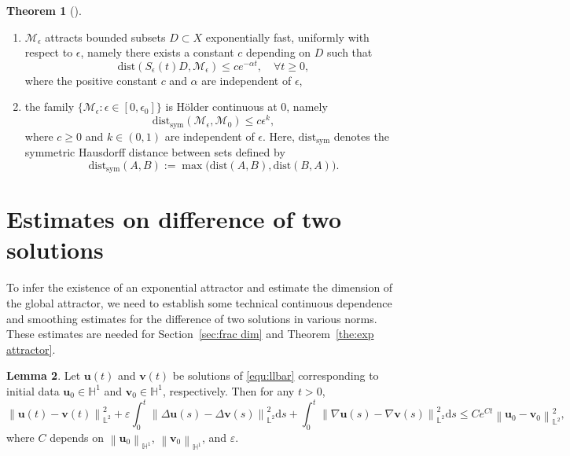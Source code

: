 \documentclass[11pt, reqno]{amsart}
\theoremstyle{definition}
\newtheorem{theorem}{Theorem}[section]
\newtheorem{lemma}[theorem]{Lemma}
\numberwithin{equation}{section}
\newcommand{\bff}{\boldsymbol}
\newcommand{\bb}{\mathbb}
\newcommand{\ds}{\mathrm{d}s}
\newcommand{\norm}[2]{\left\|{#1}\right\|_{#2}}
\begin{document}
\begin{theorem}[\cite{EfeMirZel04, MirZel08}]
\begin{enumerate}
    \item $\mathcal{M}_\epsilon$ attracts bounded subsets $D\subset X$ exponentially fast, uniformly with respect to $\epsilon$, namely there exists a constant $c$ depending on $D$ such that
    \[
        \text{dist}\left(S_\epsilon(t)D, \mathcal{M}_\epsilon\right) \leq c e^{-\alpha t}, \quad \forall t\geq 0,
    \]
    where the positive constant $c$ and $\alpha$ are independent of $\epsilon$,
    \item the family $\{\mathcal{M}_\epsilon: \epsilon\in [0,\epsilon_0]\}$ is H\"older continuous at $0$, namely
    \[
        \text{dist}_{\text{sym}} \left(\mathcal{M}_\epsilon, \mathcal{M}_0\right) \leq c\epsilon^k,
    \]
    where $c\geq 0$ and $k\in (0,1)$ are independent of $\epsilon$. Here, $\text{dist}_{\text{sym}}$ denotes the symmetric Hausdorff distance between sets defined by
    \begin{equation}\label{equ:dist symm}
        \text{dist}_{\text{sym}}(A,B):= \max\big(\text{dist}(A,B), \text{dist}(B,A)\big).
    \end{equation}
\end{enumerate}
\end{theorem}



\section{Estimates on difference of two solutions}\label{sec:app b}


To infer the existence of an exponential attractor and estimate the dimension of the global attractor, we need to establish some technical continuous dependence and smoothing estimates for the difference of two solutions in various norms. These estimates are needed for Section~\ref{sec:frac dim} and Theorem~\ref{the:exp attractor}.

\begin{lemma}\label{lem:u-vL2}
Let $\bff{u}(t)$ and $\bff{v}(t)$ be solutions of \eqref{equ:llbar} corresponding to initial data $\bff{u}_0\in \bb{H}^1$ and $\bff{v}_0\in \bb{H}^1$, respectively. Then for any $t>0$,
\begin{equation*}
    \norm{\bff{u}(t)-\bff{v}(t)}{\bb{L}^2}^2 
    +
    \varepsilon\int_0^t \norm{\Delta \bff{u}(s)-\Delta \bff{v}(s)}{\bb{L}^2}^2 \ds
    +
    \int_0^t \norm{\nabla \bff{u}(s)-\nabla \bff{v}(s)}{\bb{L}^2}^2 \ds
    \leq 
    Ce^{Ct} \norm{\bff{u}_0-\bff{v}_0}{\bb{L}^2}^2,
\end{equation*}
where $C$ depends on $\norm{\bff{u}_0}{\bb{H}^1}$, $\norm{\bff{v}_0}{\bb{H}^1}$, and $\varepsilon$.
\end{lemma}
\end{document}
